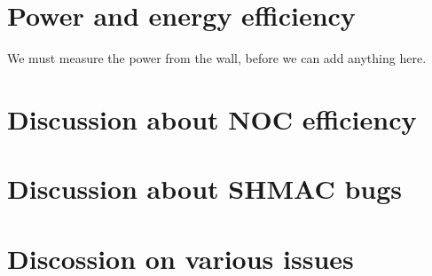 \section{Power and energy efficiency}

We must measure the power from the wall, before we can add anything here.

\section{Discussion about NOC efficiency}
\section{Discussion about SHMAC bugs}

\section{Discossion on various issues}
%



